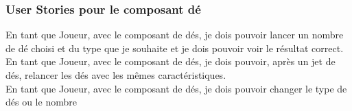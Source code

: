 \subsubsection{User Stories pour le composant dé}

En tant que Joueur, avec le composant de dés, je dois pouvoir lancer un nombre
de dé choisi et du type que je souhaite et je dois pouvoir voir le résultat
correct.\\

En tant que Joueur, avec le composant de dés, je dois pouvoir, après un jet de
dés, relancer les dés avec les mêmes caractéristiques.\\

En tant que Joueur, avec le composant de dés, je dois pouvoir changer le type de
dés ou le nombre\\


